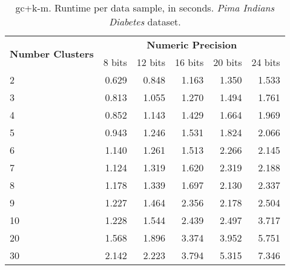 \begin{table}[h]
\centering
\caption{\acs{gc}+\acs{k-m}. Runtime per data sample, in seconds. \emph{Pima Indians Diabetes} dataset.}
\label{table:runtimeKMPID}
\vspace*{0.2cm}
\begin{tabular}{|l|r|r|r|r|r|}
\hline
\multirow{2}{*}{\textbf{Number Clusters}} & \multicolumn{5}{c|}{\textbf{Numeric Precision}}                                              \\ \cline{2-6}
                                          & 8 bits & 12 bits & 16 bits & 20 bits & 24 bits \\ \hline
2                                & 0.629           & 0.848            & 1.163            & 1.350            & 1.533            \\ \hline
3                                & 0.813           & 1.055            & 1.270            & 1.494            & 1.761            \\ \hline
4                                & 0.852           & 1.143            & 1.429            & 1.664            & 1.969            \\ \hline
5                                & 0.943           & 1.246            & 1.531            & 1.824            & 2.066            \\ \hline
6                                & 1.140           & 1.261            & 1.513            & 2.266            & 2.145            \\ \hline
7                                & 1.124           & 1.319            & 1.620            & 2.319            & 2.188            \\ \hline
8                                & 1.178           & 1.339            & 1.697            & 2.130            & 2.337            \\ \hline
9                                & 1.227           & 1.464            & 2.356            & 2.178            & 2.504            \\ \hline
10                               & 1.228           & 1.544            & 2.439            & 2.497            & 3.717            \\ \hline
20                               & 1.568           & 1.896            & 3.374            & 3.952            & 5.751            \\ \hline
30                               & 2.142           & 2.223            & 3.794            & 5.315            & 7.346            \\ \hline

\end{tabular}
\end{table}
